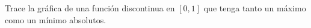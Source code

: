 \item Trace la gráfica de una función discontinua en $[0, 1]$ que tenga tanto un máximo como un mínimo absolutos.

